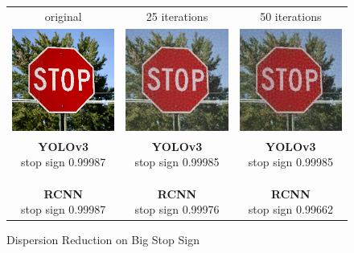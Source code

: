 \documentclass{article}
\begin{document}
\begin{figure}[h]
\centering
    \begin{tabular}{c c c}
        original & 25 iterations & 50 iterations \\
        \includegraphics[width=0.3\linewidth]{../test_images/stop.png} & \includegraphics[width=0.3\linewidth]{../test_images/dispersion_reduced/stop25.png} & \includegraphics[width=0.3\linewidth]{../test_images/dispersion_reduced/stop50.png} \\

        \makecell[t]{\textbf{YOLOv3} \\ stop sign 0.99987 \\ \\ \textbf{RCNN} \\ stop sign 0.99987} & \makecell[t]{\textbf{YOLOv3} \\ stop sign 0.99985 \\ \\ \textbf{RCNN} \\ stop sign 0.99976} & \makecell[t]{\textbf{YOLOv3} \\ stop sign 0.99985 \\ \\ \textbf{RCNN} \\ stop sign 0.99662}
\end{tabular}
\caption{Dispersion Reduction on Big Stop Sign}
\label{fig:stop1}
\end{figure}
\end{document}
